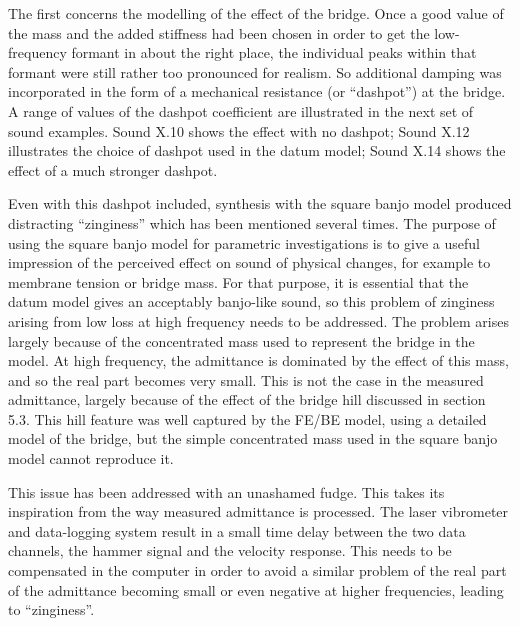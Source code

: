  The first concerns the modelling of the effect of the bridge. Once a good 
  value of the mass and the added stiffness had been chosen in order to get the 
  low-frequency formant in about the right place, the individual peaks within 
  that formant were still rather too pronounced for realism. So additional 
  damping was incorporated in the form of a mechanical resistance (or 
  ``dashpot'') at the bridge. A range of values of the dashpot coefficient are 
  illustrated in the next set of sound examples. Sound X.10 shows the effect 
  with no dashpot; Sound X.12 illustrates the choice of dashpot used in the 
  datum model; Sound X.14 shows the effect of a much stronger dashpot. 

\audio{}

\audio{}

\audio{}

\audio{}

\audio{}

  Even with this dashpot included, synthesis with the square banjo model 
  produced distracting ``zinginess'' which has been mentioned several times. 
  The purpose of using the square banjo model for parametric investigations is 
  to give a useful impression of the perceived effect on sound of physical 
  changes, for example to membrane tension or bridge mass. For that purpose, it 
  is essential that the datum model gives an acceptably banjo-like sound, so 
  this problem of zinginess arising from low loss at high frequency needs to be 
  addressed. The problem arises largely because of the concentrated mass used 
  to represent the bridge in the model. At high frequency, the admittance is 
  dominated by the effect of this mass, and so the real part becomes very 
  small. This is not the case in the measured admittance, largely because of 
  the effect of the bridge hill discussed in section 5.3. This hill feature was 
  well captured by the FE/BE model, using a detailed model of the bridge, but 
  the simple concentrated mass used in the square banjo model cannot reproduce 
  it. 

  This issue has been addressed with an unashamed fudge. This takes its 
  inspiration from the way measured admittance is processed. The laser 
  vibrometer and data-logging system result in a small time delay between the 
  two data channels, the hammer signal and the velocity response. This needs to 
  be compensated in the computer in order to avoid a similar problem of the 
  real part of the admittance becoming small or even negative at higher 
  frequencies, leading to ``zinginess''. 

